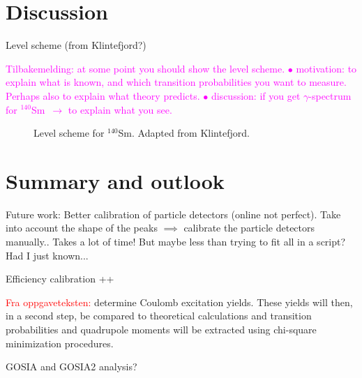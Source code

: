 \documentclass[twoside,english]{uiofysmaster/uiofysmaster}
\newcommand{\Sm}{$^{140}$Sm} %
\newcommand{\ga}{$\gamma$}
\begin{document}
\chapter{Discussion}

Level scheme (from Klintefjord?)\newline

\textcolor{Magenta}{Tilbakemelding: \newline
at some point you should show the level scheme. \newline
$\bullet$ motivation: to explain what is known, and which transition probabilities you want to measure.  \newline
Perhaps also to explain what theory predicts. \newline
$\bullet$ discussion: if you get \ga-spectrum for \Sm\ $\rightarrow$ to explain what you see.}


\begin{figure}
	\centering
	
	\caption{Level scheme for \Sm. Adapted from Klintefjord.}
	\label{fig:levels}
\end{figure}





\chapter{Summary and outlook}

Future work: Better calibration of particle detectors (online not perfect). Take into account the shape of the peaks $\implies$ calibrate the particle detectors manually.. Takes a lot of time! But maybe less than trying to fit all in a script? Had I just known...

\bigskip

Efficiency calibration ++

\bigskip

\textcolor{red}{Fra oppgaveteksten:} \newline
determine Coulomb excitation yields. These yields will then, in a second step, be compared to theoretical calculations and transition probabilities and quadrupole moments will be extracted using chi-square minimization procedures.


GOSIA and GOSIA2 analysis?
\end{document}
